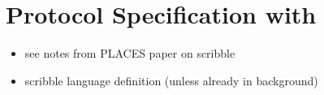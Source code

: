 \section{Protocol Specification with }

\begin{itemize}
\item see notes from PLACES paper on scribble
\item scribble language definition (unless already in background)
\end{itemize}